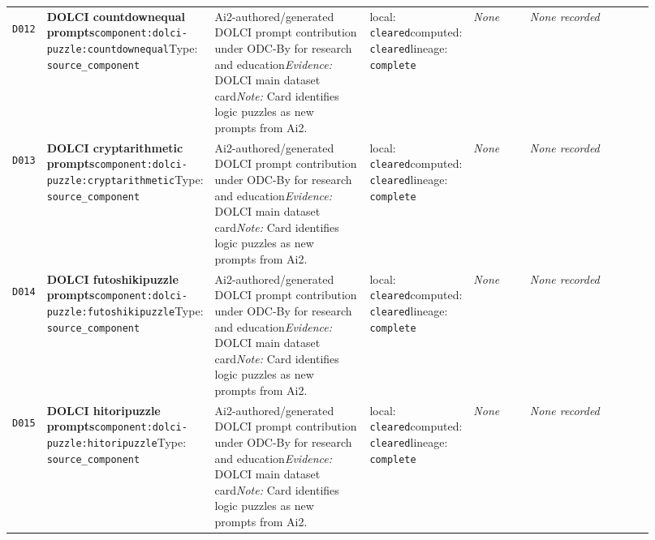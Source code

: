 \documentclass[9pt,a4paper]{article}
\newcommand{\depid}[1]{\hypertarget{dep:#1}{\texttt{#1}}}
\begin{document}
\begin{landscape}
\begin{longtable}{@{}L{0.035\linewidth}L{0.185\linewidth}L{0.27\linewidth}L{0.09\linewidth}L{0.10\linewidth}L{0.24\linewidth}@{}}
\depid{D012} & \textbf{DOLCI countdownequal prompts}\newline \nolinkurl{component:dolci-puzzle:countdownequal}\newline Type: \texttt{source\_component} & Ai2-authored/generated DOLCI prompt contribution under ODC-By for research and education\newline \textit{Evidence:} DOLCI main dataset card\newline \textit{Note:} Card identifies logic puzzles as new prompts from Ai2. & local: \texttt{cleared}\newline computed: \texttt{cleared}\newline lineage: \texttt{complete} & \textit{None} & \textit{None recorded} \\
\depid{D013} & \textbf{DOLCI cryptarithmetic prompts}\newline \nolinkurl{component:dolci-puzzle:cryptarithmetic}\newline Type: \texttt{source\_component} & Ai2-authored/generated DOLCI prompt contribution under ODC-By for research and education\newline \textit{Evidence:} DOLCI main dataset card\newline \textit{Note:} Card identifies logic puzzles as new prompts from Ai2. & local: \texttt{cleared}\newline computed: \texttt{cleared}\newline lineage: \texttt{complete} & \textit{None} & \textit{None recorded} \\
\depid{D014} & \textbf{DOLCI futoshikipuzzle prompts}\newline \nolinkurl{component:dolci-puzzle:futoshikipuzzle}\newline Type: \texttt{source\_component} & Ai2-authored/generated DOLCI prompt contribution under ODC-By for research and education\newline \textit{Evidence:} DOLCI main dataset card\newline \textit{Note:} Card identifies logic puzzles as new prompts from Ai2. & local: \texttt{cleared}\newline computed: \texttt{cleared}\newline lineage: \texttt{complete} & \textit{None} & \textit{None recorded} \\
\depid{D015} & \textbf{DOLCI hitoripuzzle prompts}\newline \nolinkurl{component:dolci-puzzle:hitoripuzzle}\newline Type: \texttt{source\_component} & Ai2-authored/generated DOLCI prompt contribution under ODC-By for research and education\newline \textit{Evidence:} DOLCI main dataset card\newline \textit{Note:} Card identifies logic puzzles as new prompts from Ai2. & local: \texttt{cleared}\newline computed: \texttt{cleared}\newline lineage: \texttt{complete} & \textit{None} & \textit{None recorded} \\

\end{longtable}
\end{landscape}
\end{document}
